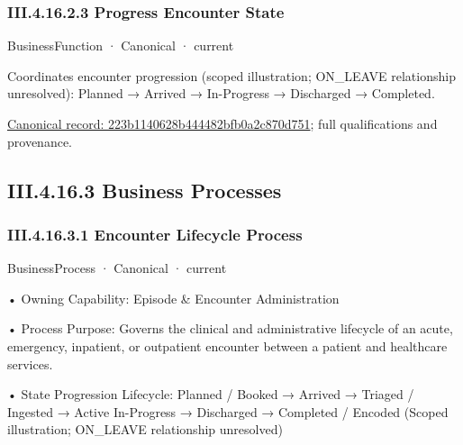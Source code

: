 \subsubsection*{III.4.16.2.3 Progress Encounter State}
\label{navigation:III.4.16.2.3}

\label{element:223b1140628b444482bfb0a2c870d751}
{\small BusinessFunction · Canonical · current}\par

Coordinates encounter progression (scoped illustration; ON\_LEAVE relationship unresolved): Planned → Arrived → In-Progress → Discharged → Completed.


{\footnotesize \href{../../../../continuum/business/business-function/223b1140628b444482bfb0a2c870d751.md}{Canonical record: 223b1140628b444482bfb0a2c870d751}; full qualifications and provenance.}\par
\subsection*{III.4.16.3 Business Processes}
\label{navigation:III.4.16.3}

\subsubsection*{III.4.16.3.1 Encounter Lifecycle Process}
\label{navigation:III.4.16.3.1}

\label{element:df49e2e8bb3748f3abbdd1c28ae1be8f}
{\small BusinessProcess · Canonical · current}\par

•
Owning Capability: Episode \& Encounter Administration



•
Process Purpose: Governs the clinical and administrative lifecycle of an acute, emergency, inpatient, or outpatient encounter between a patient and healthcare services.



•
State Progression Lifecycle: Planned / Booked → Arrived → Triaged / Ingested → Active In-Progress → Discharged → Completed / Encoded   (Scoped illustration; ON\_LEAVE relationship unresolved)



